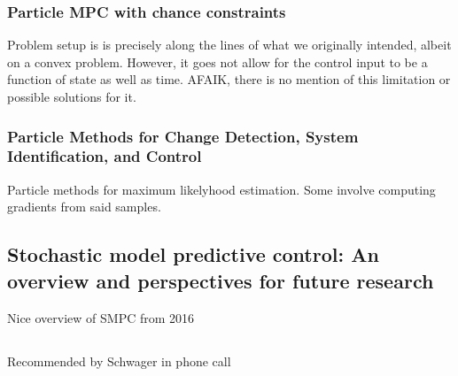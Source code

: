 \documentclass[11pt]{article}
\begin{document}
\subsubsection*{Particle MPC with chance constraints \cite{blackmore2010probabilistic}}
Problem setup is is precisely along the lines of what we originally intended, albeit on a convex problem. However, it goes not allow for the control input to be a function of state as well as time. AFAIK, there is no mention of this limitation or possible solutions for it.

\subsubsection*{Particle Methods for Change Detection, System
Identification, and Control \cite{andrieu2004particle}}
Particle methods for maximum likelyhood estimation. Some involve computing gradients from said samples.
 


\subsection*{Stochastic model predictive control: An overview and perspectives for future research \cite{mesbah2016stochastic}}
Nice overview of SMPC from 2016

\subsection*{ \cite{sehr2018stochastic}}
Recommended by Schwager in phone call



\printbibliography
\end{document}
